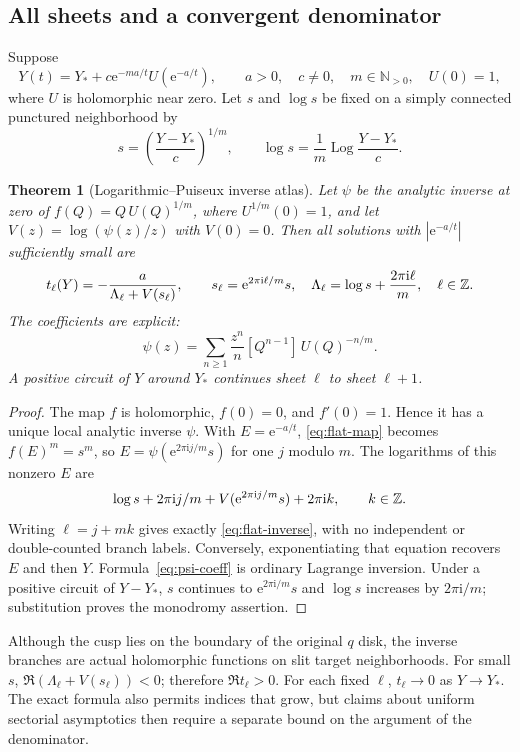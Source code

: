 \documentclass[11pt,a4paper]{article}
\numberwithin{equation}{section}
\newtheorem{theorem}{Theorem}[section]
\theoremstyle{definition}\newtheorem{definition}[theorem]{Definition}
\theoremstyle{remark}\newtheorem{remark}[theorem]{Remark}
\newcommand{\N}{\mathbb N}\newcommand{\R}{\mathbb R}
\newcommand{\ii}{\mathrm i}\newcommand{\e}{\mathrm e}
\newcommand{\Log}{\operatorname{Log}}\newcommand{\Li}{\operatorname{Li}}
\begin{document}
\subsection{All sheets and a convergent denominator}
Suppose
\begin{equation}\label{eq:flat-map}
 Y(t)=Y_*+c\e^{-ma/t}U(\e^{-a/t}),\qquad
 a>0,\quad c\ne0,\quad m\in\N_{>0},\quad U(0)=1,
\end{equation}
where $U$ is holomorphic near zero. Let $s$ and $\log s$ be fixed on a
simply connected punctured neighborhood by
\[
 s=\left(\frac{Y-Y_*}{c}\right)^{1/m},\qquad
 \log s=\frac1m\Log\frac{Y-Y_*}{c}.
\]

\begin{theorem}[Logarithmic--Puiseux inverse atlas]\label{thm:flat}
Let $\psi$ be the analytic inverse at zero of
$f(Q)=Q\,U(Q)^{1/m}$, where $U^{1/m}(0)=1$, and let
$V(z)=\log(\psi(z)/z)$ with $V(0)=0$. Then all solutions with
$|\e^{-a/t}|$ sufficiently small are
\begin{equation}\label{eq:flat-inverse}
 t_\ell(Y)=-\frac{a}{\Lambda_\ell+V(s_\ell)},\qquad
 s_\ell=\e^{2\pi\ii\ell/m}s,\quad
 \Lambda_\ell=\log s+\frac{2\pi\ii\ell}{m},\quad \ell\in\Z.
\end{equation}
The coefficients are explicit:
\begin{equation}\label{eq:psi-coeff}
 \psi(z)=\sum_{n\ge1}\frac{z^n}{n}
 [Q^{n-1}]\,U(Q)^{-n/m}.
\end{equation}
A positive circuit of $Y$ around $Y_*$ continues sheet $\ell$ to
sheet $\ell+1$.
\end{theorem}
\begin{proof}
The map $f$ is holomorphic, $f(0)=0$, and $f'(0)=1$. Hence it has a
unique local analytic inverse $\psi$. With $E=\e^{-a/t}$,
\eqref{eq:flat-map} becomes $f(E)^m=s^m$, so
$E=\psi(\e^{2\pi\ii j/m}s)$ for one $j$ modulo $m$.
The logarithms of this nonzero $E$ are
\[
 \log s+2\pi\ii j/m+V(\e^{2\pi\ii j/m}s)+2\pi\ii k,
 \qquad k\in\Z.
\]
Writing $\ell=j+mk$ gives exactly \eqref{eq:flat-inverse}, with no
independent or double-counted branch labels. Conversely, exponentiating
that equation recovers $E$ and then $Y$. Formula~\eqref{eq:psi-coeff}
is ordinary Lagrange inversion. Under a positive circuit of $Y-Y_*$,
$s$ continues to $\e^{2\pi\ii/m}s$ and $\log s$ increases by
$2\pi\ii/m$; substitution proves the monodromy assertion.
\end{proof}

Although the cusp lies on the boundary of the original $q$ disk, the
inverse branches are actual holomorphic functions on slit target
neighborhoods. For small $s$, $\Re(\Lambda_\ell+V(s_\ell))<0$;
therefore $\Re t_\ell>0$. For each fixed $\ell$, $t_\ell\to0$ as
$Y\to Y_*$. The exact formula also permits indices that grow, but claims
about uniform sectorial asymptotics then require a separate bound on the
argument of the denominator.
\end{document}
